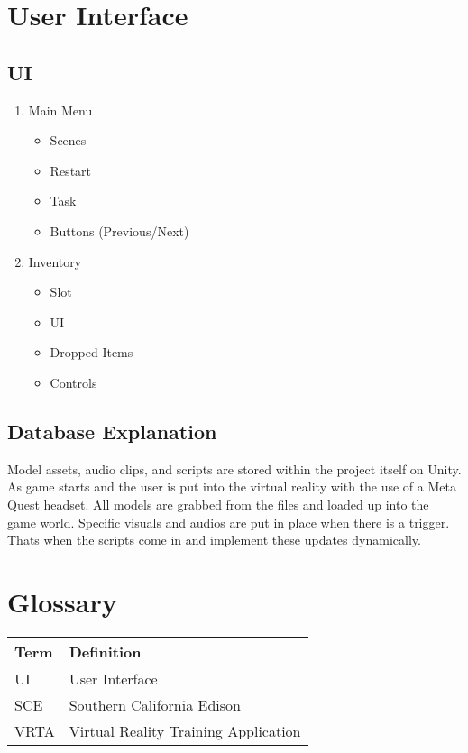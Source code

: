 \documentclass[12pt]{article}
\begin{document}
\section{User Interface}
\subsection{UI}
\begin{enumerate}
    \item Main Menu
    \begin{itemize}
        \item Scenes
        \item Restart
        \item Task
        \item Buttons (Previous/Next)
    \end{itemize}

    \item Inventory
    \begin{itemize}
        \item Slot
        \item UI
        \item Dropped Items
        \item Controls
    \end{itemize}
\end{enumerate}

\subsection{Database Explanation}
Model assets, audio clips, and scripts are stored within the project itself on Unity.
As game starts and the user is put into the virtual reality with the use of a Meta Quest headset.
All models are grabbed from the files and loaded up into the game world. Specific visuals and audios
are put in place when there is a trigger. Thats when the scripts come in and implement these updates dynamically.

\section{Glossary}
\begin{longtable}{|p{4cm}|p{10cm}|}
\hline
\textbf{Term} & \textbf{Definition} \\
\hline
UI & User Interface \\
SCE & Southern California Edison \\
VRTA & Virtual Reality Training Application \\
\hline
\end{longtable}
\end{document}
